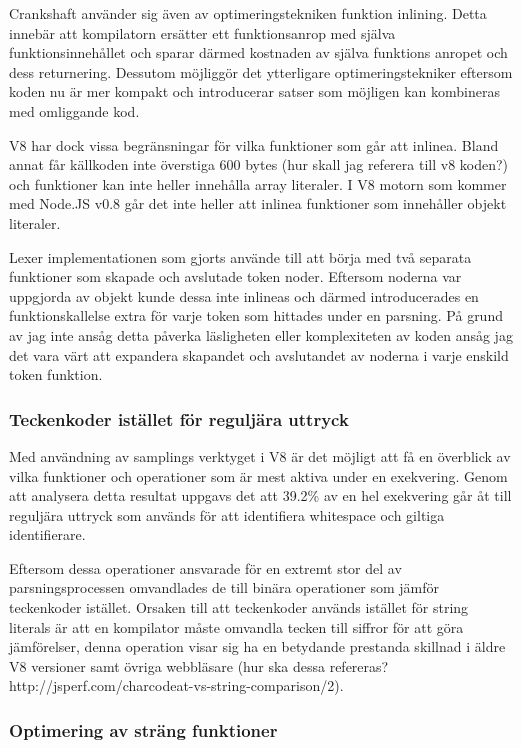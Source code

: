 Crankshaft använder sig även av optimeringstekniken funktion inlining. Detta
innebär att kompilatorn ersätter ett funktionsanrop med själva
funktionsinnehållet och sparar därmed kostnaden av själva funktions anropet
och dess returnering. Dessutom möjliggör det ytterligare optimeringstekniker
eftersom koden nu är mer kompakt och introducerar satser som möjligen kan
kombineras med omliggande kod.

V8 har dock vissa begränsningar för vilka funktioner som går att inlinea.
Bland annat får källkoden inte överstiga 600 bytes (hur skall jag referera
till v8 koden?) och funktioner kan inte heller innehålla array literaler. I V8
motorn som kommer med Node.JS v0.8 går det inte heller att inlinea funktioner
som innehåller objekt literaler.

Lexer implementationen som gjorts använde till att börja med två separata
funktioner som skapade och avslutade token noder. Eftersom noderna var
uppgjorda av objekt kunde dessa inte inlineas och därmed introducerades en
funktionskallelse extra för varje token som hittades under en parsning. På
grund av jag inte ansåg detta påverka läsligheten eller komplexiteten av koden
ansåg jag det vara värt att expandera skapandet och avslutandet av noderna i
varje enskild token funktion.

\subsubsection{Teckenkoder istället för reguljära uttryck}

Med användning av samplings verktyget i V8 är det möjligt att få en överblick
av vilka funktioner och operationer som är mest aktiva under en exekvering.
Genom att analysera detta resultat uppgavs det att 39.2\% av en hel exekvering
går åt till reguljära uttryck som används för att identifiera whitespace och
giltiga identifierare.

Eftersom dessa operationer ansvarade för en extremt stor del av
parsningsprocessen omvandlades de till binära operationer som jämför
teckenkoder istället. Orsaken till att teckenkoder används istället för string
literals är att en kompilator måste omvandla tecken till siffror för att göra
jämförelser, denna operation visar sig ha en betydande prestanda skillnad i
äldre V8 versioner samt övriga webbläsare
(hur ska dessa refereras? http://jsperf.com/charcodeat-vs-string-comparison/2).

\subsubsection{Optimering av sträng funktioner}

